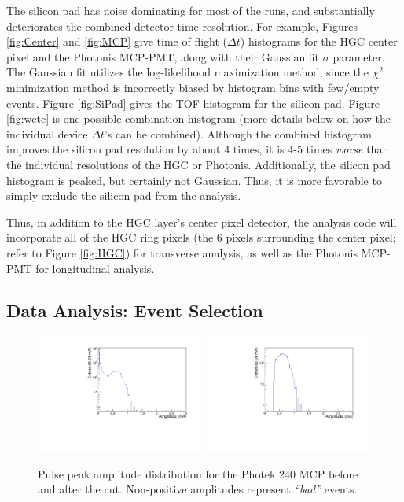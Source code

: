 \documentclass[twocolumn,aps,prd,reprint,superscriptaddress,floatfix]{revtex4-1}
\begin{document}
The silicon pad has noise dominating for most of the runs, and substantially deteriorates the combined detector time resolution. 
For example, Figures \ref{fig:Center} and \ref{fig:MCP} give time of flight ($\Delta t$) histograms for the HGC center pixel and the Photonis MCP-PMT, along with their Gaussian fit $\sigma$ parameter. 
The Gaussian fit utilizes the log-likelihood maximization method, since the $\chi^2$ minimization method is incorrectly biased by histogram bins with few/empty events.
Figure \ref{fig:SiPad} gives the TOF histogram for the silicon pad. 
Figure \ref{fig:wctc} is one possible combination histogram (more details below on how the individual device $\Delta t$'s can be combined). 
Although the combined histogram improves the silicon pad resolution by about 4 times, it is 4-5 times \textit{worse} than the individual resolutions of the HGC or Photonis. 
Additionally, the silicon pad histogram is peaked, but certainly not Gaussian. 
Thus, it is more favorable to simply exclude the silicon pad from the analysis.

Thus, in addition to the HGC layer's center pixel detector, the analysis code will incorporate all of the HGC ring pixels (the 6 pixels surrounding the center pixel; refer to Figure \ref{fig:HGC}) for transverse analysis, as well as the Photonis MCP-PMT for longitudinal analysis.


\subsection{Data Analysis: Event Selection}

\begin{figure}[!htb]
\centering
	\includegraphics[width=0.49\textwidth]{PhotekAmp.pdf}
	\includegraphics[width=0.49\textwidth]{PhotekAmpCut.pdf}
	\caption{Pulse peak amplitude distribution for the Photek 240 MCP before and after the cut.
		Non-positive amplitudes represent \textit{``bad''} events.}
	\label{fig:AmpCut}
\end{figure}
\end{document}
